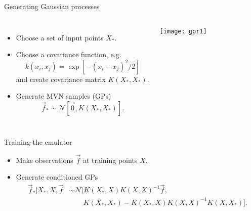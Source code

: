 \documentclass{beamer}
\begin{document}
\begin{frame}[label=gengp]{Generating Gaussian processes}
  \begin{columns}
    \begin{itemize}
      \item Choose a set of input points $X_*$.
      \item Choose a covariance function, e.g.\
        \begin{equation*}
          k(x_i,x_j) = \exp[-(x_i-x_j)^2/2]
        \end{equation*}
        and create covariance matrix $K(X_*,X_*)$.
      \item Generate MVN samples (GPs)
        \begin{equation*}
          \vec f_* \sim \mathcal N[\vec 0,K(X_*,X_*)].
        \end{equation*}
    \end{itemize}

    \texttt{[image: gpr1]}
  \end{columns}

\end{frame}


\begin{frame}[label=training]{Training the emulator}
  \begin{itemize}
    \item Make observations $\vec f$ at training points $X$.
    \item Generate conditioned GPs
        \begin{align*}
          \vec f_* | X_*,X,\vec f &\sim \mathcal N[K(X_*,X)K(X,X)^{-1}\vec f, \\
          &\qquad {} K(X_*,X_*) - K(X_*,X)K(X,X)^{-1}K(X,X_*)].
        \end{align*}
  \end{itemize}

  \centering


\end{frame}
\end{document}
